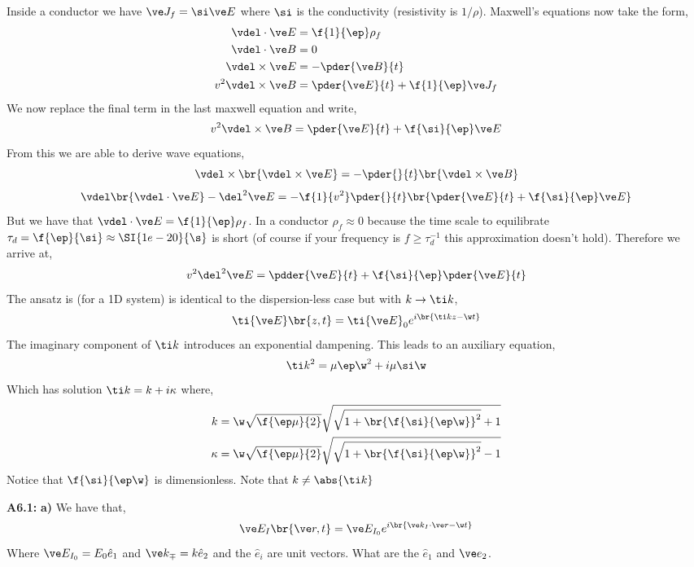 \documentclass{article}
\begin{document}
Inside a conductor we have $\ve J_f = \si \ve E$ where $\si$ is the conductivity (resistivity is $1/\rho$). Maxwell's equations now take the form,
\begin{align*}
    \vdel \cdot \ve E &= \f{1}{\ep} \rho_{f} \\
    \vdel \cdot \ve B &= 0 \\
    \vdel \times \ve E &= -\pder{\ve B}{t} \\
    v^2\vdel \times \ve B &= \pder{\ve E}{t} + \f{1}{\ep} \ve J_f
\end{align*}
We now replace the final term in the last maxwell equation and write,
\[ v^2\vdel \times \ve B = \pder{\ve E}{t} + \f{\si}{\ep} \ve E \]
From this we are able to derive wave equations,
\[ \vdel \times \br{\vdel \times \ve E} = - \pder{}{t}\br{\vdel \times \ve B} \]
\[ \vdel \br{\vdel \cdot \ve E} - \del^2 \ve E = -\f{1}{v^2} \pder{}{t}\br{\pder{\ve E}{t} + \f{\si}{\ep} \ve E} \]
But we have that $\vdel \cdot \ve E = \f{1}{\ep} \rho_{f}$. In a conductor $\rho_{f} \approx 0$ because the time scale to equilibrate $\tau_{d} = \f{\ep}{\si} \approx \SI{1e-20}{\s}$ is short (of course if your frequency is $f \geq \tau_d^{-1}$ this approximation doesn't hold).
Therefore we arrive at,
\[ v^2 \del^2 \ve E = \pdder{\ve E}{t} + \f{\si}{\ep} \pder{\ve E}{t} \]
The ansatz is (for a 1D system) is identical to the dispersion-less case but with $k \to \ti k$,
\[ \ti{\ve E}\br{z,t} = \ti{\ve E}_0 e^{i\br{\ti k z - \w t}} \]
The imaginary component of $\ti k$ introduces an exponential dampening. This leads to an auxiliary equation,
\[ \ti k^2 = \mu \ep \w^2 + i \mu \si \w \]
Which has solution $\ti k = k + i \kappa$ where,
\begin{align*}
    k &= \w \sqrt{\f{\ep \mu}{2}} \sqrt{\sqrt{1 + \br{\f{\si}{\ep \w}}^2}+1} \\
    \kappa &= \w \sqrt{\f{\ep \mu}{2}} \sqrt{\sqrt{1 + \br{\f{\si}{\ep \w}}^2}-1}
\end{align*}
Notice that $\f{\si}{\ep \w}$ is dimensionless. Note that $k \neq \abs{\ti k}$

\textbf{A6.1:} \textbf{a)} We have that,
\[ \ve E_I \br{\ve r, t} = \ve E_{I_0} e ^{i \br{\ve k_I \cdot \ve r - \w t}} \]
Where $\ve E_{I_0} = E_0 \hat e_1$ and $\ve k_{\mp} = k \hat e_2$ and the $\hat e_i$ are unit vectors. What are the $\hat e_1$ and $\ve e_2$.
\end{document}
